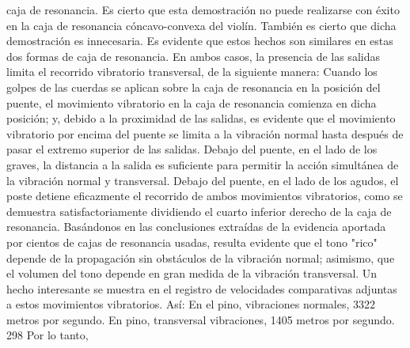 caja de resonancia.
Es cierto que esta demostración no puede realizarse con éxito en la caja de resonancia cóncavo-convexa del violín. También es cierto que dicha demostración es innecesaria. Es evidente que estos hechos son similares en estas dos formas de caja de resonancia. En ambos casos, la presencia de las salidas limita el recorrido vibratorio transversal, de la siguiente manera: Cuando los golpes de las cuerdas se aplican sobre la caja de resonancia en la posición del puente, el movimiento vibratorio en la caja de resonancia comienza en dicha posición; y, debido a la proximidad de las salidas, es evidente que el movimiento vibratorio por encima del puente se limita a la vibración normal hasta después de pasar el extremo superior de las salidas. Debajo del puente, en el lado de los graves, la distancia a la salida es suficiente para permitir la acción simultánea de la vibración normal y transversal. Debajo del puente, en el lado de los agudos, el poste detiene eficazmente el recorrido de ambos movimientos vibratorios, como se demuestra satisfactoriamente dividiendo el cuarto inferior derecho de la caja de resonancia. Basándonos en las conclusiones extraídas de la evidencia aportada por cientos de cajas de resonancia usadas, resulta evidente que el tono "rico" depende de la propagación sin obstáculos de la vibración normal; asimismo, que el volumen del tono depende en gran medida de la vibración transversal.
Un hecho interesante se muestra en el registro de velocidades comparativas adjuntas a estos movimientos vibratorios. Así: En el pino, vibraciones normales,
3322 metros
por segundo. En pino, transversal
vibraciones, 1405 metros por segundo. 298	Por lo tanto,

